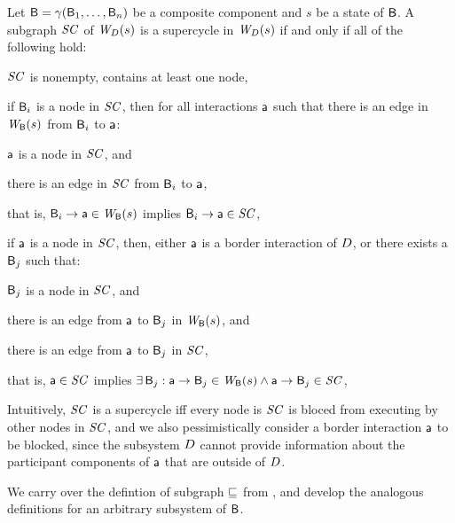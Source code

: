 \begin{definition}
\label{defn:supercycleLoc} 
Let $\B = \gamma(\B_1,\dots,\B_n)$ be a composite component and $s$ be a state of $\B$.
A subgraph $\SC$ of  $\lwfg{B}{s}{\DS}$ is a supercycle in $\lwfg{B}{s}{\DS}$ if and only if all of the following hold:
\begin{nlst1}
   \item $\SC$ is nonempty, \ie contains at least one node,

   \item if $\B_i$ is a node in $\SC$, then for all interactions $\act$ such that
there is an edge in $\wfg{\B}{s}$ from $\B_i$ to $\act$:
      \begin{nlst2}
      \item $\act$ is a node in $\SC$, and 
      \item there is an edge in $\SC$ from $\B_i$ to $\act$,
      \end{nlst2}
that is, $\B_i \ar \act \in \wfg{\B}{s}$ implies $\B_i \ar \act \in \SC$,

   \item \label{def:supercycle.action-blocked}  \label{clause:supercycle.action-blocked}  
if $\act$ is a node in $\SC$, then, either $\act$ is a border interaction of $\DS$, or  there exists a $\B_j$ such that:
      \begin{nlst2}
      \item $\B_j$  is a node in $\SC$, and
      \item there is an edge from $\act$ to $\B_j$ in $\wfg{\B}{s}$, and
      \item there is an edge from $\act$ to $\B_j$ in $\SC$,
      \end{nlst2}
that is, $\act \in \SC$ implies $\ex \B_j : \act \ar \B_j \in \wfg{\B}{s} \land \act \ar \B_j \in \SC$,

\end{nlst1}
\end{definition}
Intuitively, $\SC$ is a supercycle iff every node is $\SC$ is bloced from executing by other nodes in $\SC$, and we also pessimistically consider
a border interaction $\act$ to be blocked, since the subsystem $\DS$ cannot provide information about the participant components of $\act$ that are outside
of $\DS$. 



We carry over the defintion of subgraph $\subg$ from , and develop the analogous definitions for an arbitrary subsystem of $\B$.


